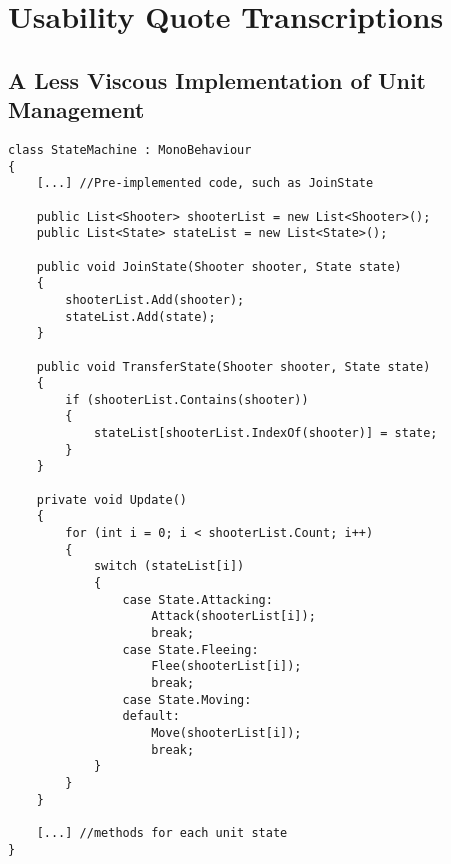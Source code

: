\chapter{Usability Quote Transcriptions} \label{app:user:quotes}

\section{A Less Viscous Implementation of Unit Management} \label{app:csharp:non:viscous}
\begin{listing}
\begin{verbatim}
class StateMachine : MonoBehaviour
{
    [...] //Pre-implemented code, such as JoinState

    public List<Shooter> shooterList = new List<Shooter>();
    public List<State> stateList = new List<State>();

    public void JoinState(Shooter shooter, State state)
    {
        shooterList.Add(shooter);
        stateList.Add(state);
    }

    public void TransferState(Shooter shooter, State state)
    {
        if (shooterList.Contains(shooter))
        {
            stateList[shooterList.IndexOf(shooter)] = state;
        }
    }

    private void Update()
    {
        for (int i = 0; i < shooterList.Count; i++)
        {
            switch (stateList[i])
            {
                case State.Attacking:
                    Attack(shooterList[i]);
                    break;
                case State.Fleeing:
                    Flee(shooterList[i]);
                    break;
                case State.Moving:
                default:
                    Move(shooterList[i]);
                    break;
            }
        }
    }

    [...] //methods for each unit state
}
\end{verbatim}
\end{listing}